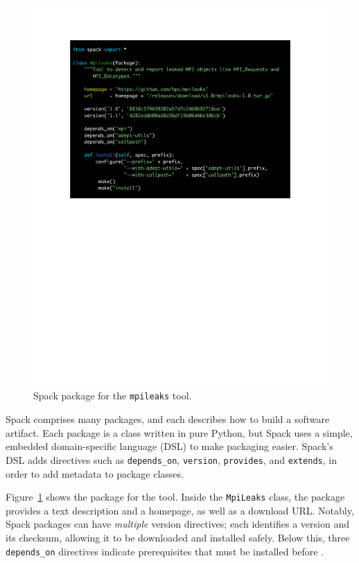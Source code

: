 \begin{figure}
	\includegraphics[width=\columnwidth]{code/mpileaks.pdf}
	\caption{
		Spack package for the {\tt mpileaks} tool.
		\label{fig:mpileaks}
	}
\end{figure}

Spack comprises many packages, and each describes how to build a software
artifact.  Each package is a class written in pure Python, but Spack uses
a simple, embedded domain-specific language (DSL) to make packaging easier.
Spack's DSL adds directives such as {\tt depends\_on}, {\tt version},
{\tt provides}, and {\tt extends}, in order to add metadata to package classes.

Figure~\ref{fig:mpileaks} shows the package for the \mpileaks tool.
Inside the {\tt MpiLeaks} class, the package provides a text description
and a homepage, as well as 
a download URL.  Notably, Spack packages can have {\it multiple} version
directives; each identifies a version and its checksum, allowing it to 
be downloaded and installed safely. Below this, three {\tt depends\_on}
directives indicate prerequisites that must be installed before \mpileaks.

